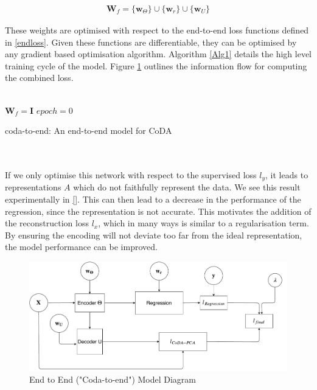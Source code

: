 \begin{align}
    \mathbf{W}_f = \{\mathbf{w}_\Theta\} \cup \{\mathbf{w}_r\} \cup \{\mathbf{w}_U\}
\end{align}

These weights are optimised with respect to the end-to-end loss functions defined in \ref{endloss}. Given these functions are differentiable, they can be optimised by any gradient based optimisation algorithm. Algorithm \ref{Alg1} details the high level training cycle of the model. Figure \ref{fig:model} outlines the information flow for computing the combined loss. \\\\


\begin{algorithm}[H]
\SetAlgoLined
{}

$\mathbf{W}_f = \mathbf{I}$  \;
 $epoch = 0$ \;
 \caption{coda-to-end: An end-to-end model for CoDA}
 \label{Alg1}
\end{algorithm} ~\\\\

If we only optimise this network with respect to the supervised loss $l_y$, it leads to representations $A$ which do not faithfully represent the data. We see this result experimentally in \ref{}. This can then lead to a decrease in the performance of the regression, since the representation is not accurate. This motivates the addition of the reconstruction loss $l_x$, which in many ways is similar to a regularisation term. By ensuring the encoding will not deviate too far from the ideal representation, the model performance can be improved.   



\begin{figure}
    \centering
    \includegraphics[width=17cm]{figs/codadiagram.pdf}
    \caption{End to End ("Coda-to-end") Model Diagram}
    \label{fig:model}
\end{figure}


